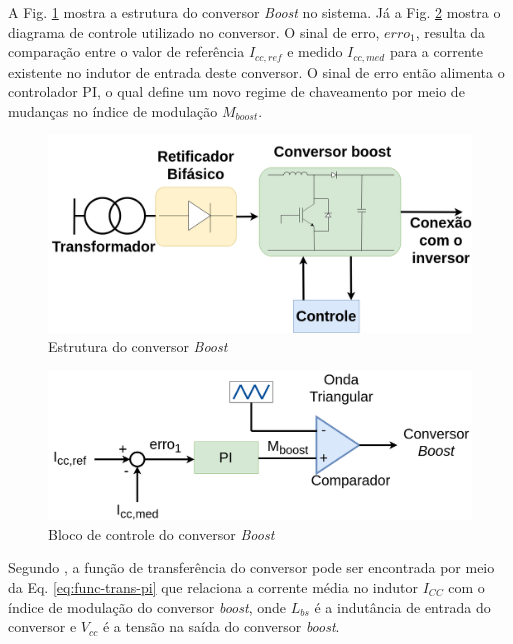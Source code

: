 A Fig. \ref{fig:estrutura-boost} mostra a estrutura do conversor \textit{Boost} no sistema.
Já a Fig. \ref{fig:controle-boost} mostra o diagrama de controle utilizado no conversor.
O sinal de erro, $erro_1$, resulta da comparação entre o valor de referência $I_{cc,ref}$ 
e medido $I_{cc,med}$ para a corrente existente no indutor de entrada deste conversor. 
O sinal de erro então alimenta o controlador PI, o qual define um novo regime de chaveamento 
por meio de mudanças no índice de modulação $M_{boost}$.

\begin{figure}[!hbt]
	\begin{center}
		\includegraphics[scale=0.20]{figuras/estrutura_conversor_boost.png}
		\caption{Estrutura do conversor \textit{Boost}}
		\label{fig:estrutura-boost}
	\end{center}
\end{figure}

\begin{figure}[!hbt]
	\begin{center}
		\includegraphics[scale=0.25]{figuras/controle_boost.png}
		\caption{Bloco de controle do conversor \textit{Boost}}
		\label{fig:controle-boost}
	\end{center}
\end{figure}

Segundo \cite{TeseProfAlex}, a função de transferência do conversor pode ser encontrada por meio da 
Eq. \ref{eq:func-trans-pi} que relaciona a corrente média no indutor $I_{CC}$ com o índice de 
modulação do conversor \textit{boost}, onde $L_{bs}$ é a indutância de entrada do conversor e 
$V_{cc}$ é a tensão na saída do conversor \textit{boost}.

